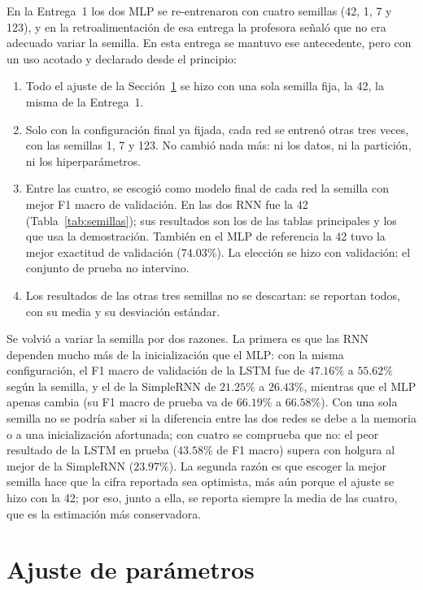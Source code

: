 \documentclass[12pt, a4paper]{article}
\begin{document}
En la Entrega~1 los dos MLP se re-entrenaron con cuatro semillas (42, 1, 7 y 123), y en la retroalimentación de esa entrega la profesora señaló que no era adecuado variar la semilla. En esta entrega se mantuvo ese antecedente, pero con un uso acotado y declarado desde el principio:
\begin{enumerate}
    \item Todo el ajuste de la Sección~\ref{sec:ajuste} se hizo con una sola semilla fija, la 42, la misma de la Entrega~1.
    \item Solo con la configuración final ya fijada, cada red se entrenó otras tres veces, con las semillas 1, 7 y 123. No cambió nada más: ni los datos, ni la partición, ni los hiperparámetros.
    \item Entre las cuatro, se escogió como modelo final de cada red la semilla con mejor F1 macro de validación. En las dos RNN fue la 42 (Tabla~\ref{tab:semillas}); sus resultados son los de las tablas principales y los que usa la demostración. También en el MLP de referencia la 42 tuvo la mejor exactitud de validación ($74.03\%$). La elección se hizo con validación: el conjunto de prueba no intervino.
    \item Los resultados de las otras tres semillas no se descartan: se reportan todos, con su media y su desviación estándar.
\end{enumerate}

Se volvió a variar la semilla por dos razones. La primera es que las RNN dependen mucho más de la inicialización que el MLP: con la misma configuración, el F1 macro de validación de la LSTM fue de $47.16\%$ a $55.62\%$ según la semilla, y el de la SimpleRNN de $21.25\%$ a $26.43\%$, mientras que el MLP apenas cambia (su F1 macro de prueba va de $66.19\%$ a $66.58\%$). Con una sola semilla no se podría saber si la diferencia entre las dos redes se debe a la memoria o a una inicialización afortunada; con cuatro se comprueba que no: el peor resultado de la LSTM en prueba ($43.58\%$ de F1 macro) supera con holgura al mejor de la SimpleRNN ($23.97\%$). La segunda razón es que escoger la mejor semilla hace que la cifra reportada sea optimista, más aún porque el ajuste se hizo con la 42; por eso, junto a ella, se reporta siempre la media de las cuatro, que es la estimación más conservadora.

\section{Ajuste de parámetros}\label{sec:ajuste}
\end{document}
